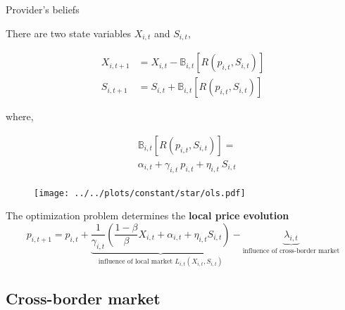 \documentclass{beamer}
\newcommand{\B}{\mathbb{B}}
\begin{document}
\begin{frame}{Provider's beliefs}

    There are two state variables $X_{i, t}$ and $S_{i, t}$,

    \begin{equation*}
        \begin{split}
            X_{i, t+1} &= X_{i, t} - \B_{i, t} \left[R(p_{i, t}, S_{i, t}) \right] \\
            S_{i, t+1} &= S_{i, t} + \B_{i, t} \left[R(p_{i, t}, S_{i, t}) \right]
        \end{split}
    \end{equation*}

    where,

    \begin{minipage}{.45\textwidth}
        \begin{equation*}
            \begin{split}
                &\B_{i, t} \left[R(p_{i, t}, S_{i, t}) \right] = \\
                &\alpha_{i, t} + \gamma_{i, t} \  p_{i, t} + \eta_{i, t} \ S_{i, t}
            \end{split}
        \end{equation*}
    \end{minipage}
    \hfill
    \begin{minipage}{.45\textwidth}
        \begin{figure}
            \texttt{[image: ../../plots/constant/star/ols.pdf]}
        \end{figure}
    \end{minipage}

\end{frame}

\begin{frame}

    The optimization problem determines the \textbf{local price evolution}
    \begin{equation*}
        p_{i, t+1} = p_{i, t} + \underbrace{\frac{1}{\gamma_{i, t}} \left( \frac{1-\beta}{\beta } X_{i, t} + \alpha_{i, t} + \eta_{i, t} S_{i, t} \right)}_{\text{influence of local market } L_{i, t}(X_{i, t}, S_{i, t})} - \underbrace{\lambda_{i, t}}_{\text{influence of cross-border market}}
    \end{equation*}

\end{frame}

\subsection{Cross-border market}
\end{document}

